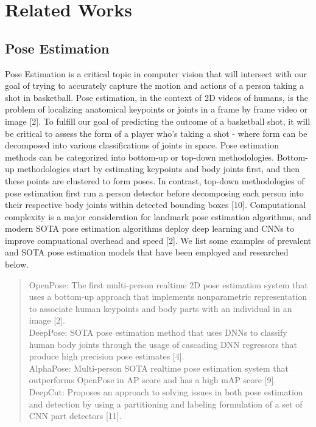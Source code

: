 \documentclass[10pt,twocolumn,letterpaper]{article}
\begin{document}
\section{Related Works}
\label{sec:formatting}

\subsection{Pose Estimation}

Pose Estimation is a critical topic in computer vision that will intersect with our goal of trying to accurately capture the motion and actions of a person taking a shot in basketball. Pose estimation, in the context of 2D videos of humans, is the problem of localizing anatomical keypoints or joints in a frame by frame video or image [2]. To fulfill our goal of predicting the outcome of a basketball shot, it will be critical to assess the form of a player who's taking a shot - where form can be decomposed into various classifications of joints in space. Pose estimation methods can be categorized into bottom-up or top-down methodologies. Bottom-up methodologies start by estimating keypoints and body joints first, and then these points are clustered to form poses. In contrast, 
top-down methodologies of pose estimation first run a person detector before decomposing each person into their respective body joints within detected bounding boxes [10]. Computational complexity is a major consideration for landmark pose estimation algorithms, and modern SOTA pose estimation algorithms deploy deep learning and CNNs to improve compuational overhead and speed [2]. We list some examples of prevalent and SOTA pose estimation models that have been employed and researched below.
%
\begin{quotation}
  OpenPose: The first multi-person realtime 2D pose estimation system that uses a bottom-up approach that implements nonparametric representation to associate human keypoints and body parts with an individual in an image [2]. \\
  \newline
  \indent DeepPose: SOTA pose estimation method that uses DNNs to classify human body joints through the usage of cascading DNN regressors that produce high precision pose estimates [4]. \\
  \newline
  \indent AlphaPose: Multi-person SOTA realtime pose estimation system that outperforms OpenPose in AP score and has a high mAP score [9]. \\
  \newline
  \indent DeepCut: Proposes an approach to solving issues in both pose estimation and detection by using a partitioning and labeling formulation of a set of CNN part detectors [11].
\end{quotation}
%
\end{document}

